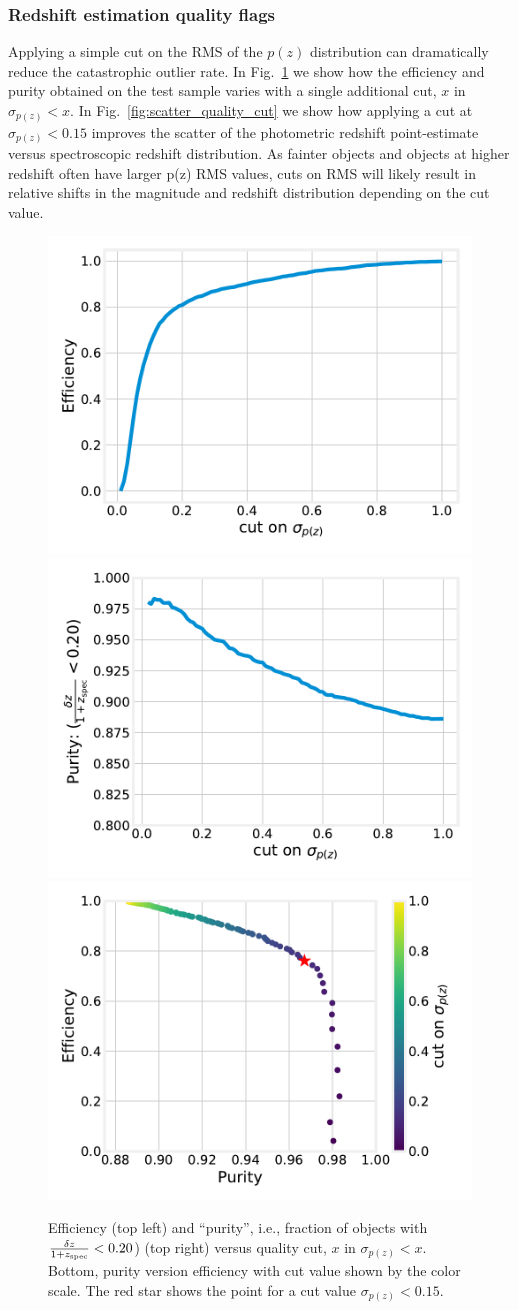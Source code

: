 \subsubsection{Redshift estimation quality flags}
\label{sec:performance:pz}

Applying a simple cut on the RMS of the $p(z)$ distribution can dramatically reduce the catastrophic outlier rate.  In Fig.~\ref{fig:perf_quality_cut} we show how the efficiency and purity obtained on the test sample varies with a single additional cut, $x$ in $\sigma_{p(z)} < x$.   In Fig.~\ref{fig:scatter_quality_cut} we show how applying a cut at $\sigma_{p(z)} < 0.15$ improves the scatter of the photometric redshift point-estimate versus spectroscopic redshift distribution.  As fainter objects and objects at higher redshift often have larger p(z) RMS values, cuts on RMS will likely result in relative shifts in the magnitude and redshift distribution depending on the cut value.

\begin{figure}
    \centering
    \includegraphics[width=0.45\linewidth]{figures/efficiency.pdf}
    \includegraphics[width=0.45\linewidth]{figures/purity.pdf} \\
    \includegraphics[width=0.45\linewidth]{figures/purity_v_effic.pdf} \\
    \caption{Efficiency (top left) and ``purity'', i.e., fraction of objects with $\frac{\delta z}{1 + z_{\rm spec}} < 0.20$) (top right) versus quality cut, $x$ in $\sigma_{p(z)} < x$.   Bottom, purity version efficiency with cut value shown by the color scale.   The red star shows the point for a cut value  $\sigma_{p(z)} < 0.15$.}
    \label{fig:perf_quality_cut}
\end{figure}

